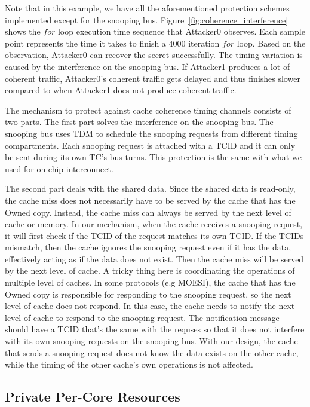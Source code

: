 Note that in this example, we have all the aforementioned protection schemes implemented except for the snooping bus.
Figure~\ref{fig:coherence_interference} shows the $for$ loop execution time sequence that Attacker0 observes. Each
sample point represents the time it takes to finish a 4000 iteration $for$ loop. Based on the observation, Attacker0
can recover the secret successfully. The timing variation is caused by the interference on the snooping bus. If Attacker1
produces a lot of coherent traffic, Attacker0's coherent traffic gets delayed and thus finishes slower compared to
when Attacker1 does not produce coherent traffic. 

The mechanism to protect against cache coherence timing channels consists of two parts. The first part solves the 
interference on the snooping bus. The snooping bus uses TDM to schedule the snooping requests from different timing
compartments. Each snooping request is attached with a TCID and it can only be sent during its own TC's bus turns.
This protection is the same with what we used for on-chip interconnect. 

The second part deals
with the shared data. Since the shared data is read-only, the cache miss does not necessarily have to be served by
the cache that has the Owned copy. Instead, the cache miss can always be served by the next level of cache or memory.
In our mechanism, when the cache receives a snooping request, it will first check if the TCID of the request matches its
own TCID. If the TCIDs mismatch, then the cache ignores the snooping request even if it has the data, effectively acting
as if the data does not exist. Then the cache miss will be served by the next level of cache. A tricky thing here is
coordinating the operations of multiple level of caches. In some protocols (e.g MOESI), the cache that has the Owned copy
is responsible for responding to the snooping request, so the next level of cache does not respond. In this case, the
cache needs to notify the next level of cache to respond to the snooping request. The notification message should
have a TCID that's the same with the requses so that it does not interfere with its own snooping requests on the snooping 
bus. With our design, the cache that sends a snooping request does not know the data exists on the other cache, while
the timing of the other cache's own operations is not affected.
 
\subsection{Private Per-Core Resources}

